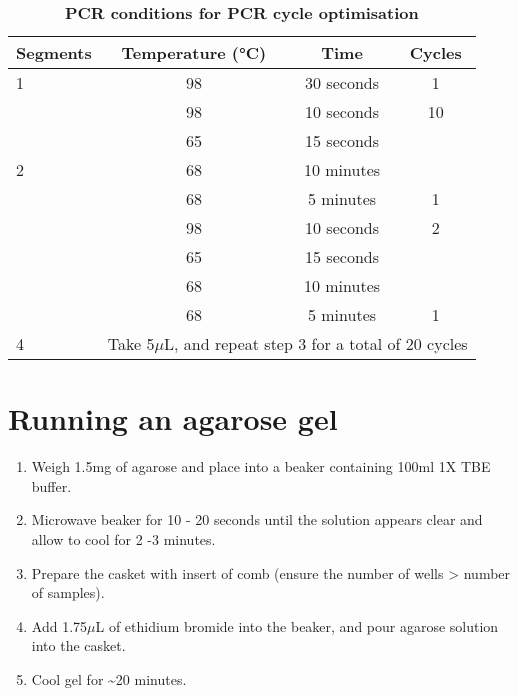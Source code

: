 \vspace{1cm}
\begin{table}[h]
	\centering
	\caption[PCR conditions for PCR cycle optimisations]%
	{\textbf{PCR conditions for PCR cycle optimisation}}
	\label{tab:PCR_condition_cycleoptim}
	\begin{tabularx}{0.8\textwidth}{lccc}
		\toprule
		Segments           & Temperature (°C)             & Time                  & Cycles            \\ \midrule
		1                  & 98                           & 30 seconds            & 1                 \\
		\multirow{5}{*}{2} & 98                           & 10 seconds            & 10                \\
		& 65                           & 15 seconds            &                   \\
		& 68                           & 10 minutes            &                   \\
		& 68                           & 5 minutes             & 1                 \\
		\multirow{4}{*}{3} & 98                           & 10 seconds            & 2                 \\
		& 65                           & 15 seconds            &                   \\
		& 68                           & 10 minutes            &                   \\
		& 68                           & 5 minutes             & 1                 \\
		4                  & \multicolumn{3}{c}{Take 5$\mu$L, and repeat step 3 for a total of 20 cycles} \\
		\bottomrule
	\end{tabularx}
\end{table}

	
\section{Running an agarose gel}
\label{Isoseq_Protocol_running_agarose_gel}
\begin{enumerate}
	\item Weigh 1.5mg of agarose and place into a beaker containing 100ml 1X TBE buffer. 
	\item Microwave beaker for 10 - 20 seconds until the solution appears clear and allow to cool for 2 -3 minutes. 
	\item Prepare the casket with insert of comb (ensure the number of wells > number of samples).
	\item Add 1.75$\mu$L of ethidium bromide into the beaker, and pour agarose solution into the casket. 
	\item Cool gel for \textasciitilde20 minutes.
\end{enumerate} 

